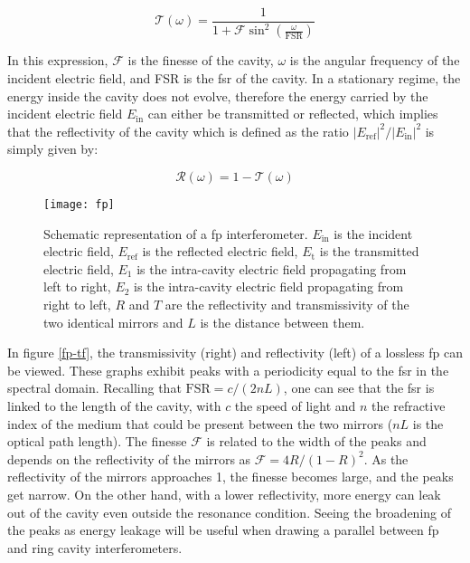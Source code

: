 \begin{equation}
	\mathcal{T}(\omega) = \frac{1}{1+\mathcal{F}\sin^2{\left(\frac{\omega}{\text{FSR}}\right)}}
	\label{transmissivity}
\end{equation}

In this expression, $\mathcal{F}$ is the finesse of the cavity, $\omega$ is the angular frequency of the incident electric field, and FSR is the \acrlong{fsr} of the cavity. In a stationary regime, the energy inside the cavity does not evolve, therefore the energy carried by the incident electric field $E_{\text{in}}$ can either be transmitted or reflected, which implies that the reflectivity of the cavity which is defined as the ratio $|E_{\text{ref}}|^2/|E_{\text{in}}|^2$ is simply given by:

\begin{equation}
	\mathcal{R}(\omega) = 1 - \mathcal{T}(\omega)
	\label{reflectivity}
\end{equation}

\begin{figure}[h]
	\centering
	\texttt{[image: fp]}
	\caption{Schematic representation of a \acrlong{fp} interferometer. $E_{\text{in}}$ is the incident electric field, $E_{\text{ref}}$ is the reflected electric field, $E_{\text{t}}$ is the transmitted electric field, $E_{1}$ is the intra-cavity electric field propagating from left to right, $E_{2}$ is the intra-cavity electric field propagating from right to left, $R$ and $T$ are the reflectivity and transmissivity of the two identical mirrors and $L$ is the distance between them.}
	\label{fp}
\end{figure}

In figure \ref{fp-tf}, the transmissivity (right) and reflectivity (left) of a lossless \gls{fp} can be viewed. These graphs exhibit peaks with a periodicity equal to the \gls{fsr} in the spectral domain. Recalling that $\text{FSR} = c/(2nL)$, one can see that the \gls{fsr} is linked to the length of the cavity, with $c$ the speed of light and $n$ the refractive index of the medium that could be present between the two mirrors ($nL$ is the optical path length). The finesse $\mathcal{F}$ is related to the width of the peaks and depends on the reflectivity of the mirrors as $\mathcal{F} = 4R/(1-R)^2$. As the reflectivity of the mirrors approaches 1, the finesse becomes large, and the peaks get narrow. On the other hand, with a lower reflectivity, more energy can leak out of the cavity even outside the resonance condition. Seeing the broadening of the peaks as energy leakage will be useful when drawing a parallel between \gls{fp} and ring cavity interferometers.

